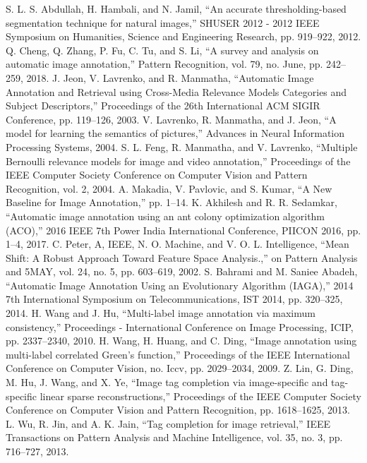 \documentclass[conference]{IEEEtran}
\begin{document}
\begin{thebibliography}{00}
	
	 S. L. S. Abdullah, H. Hambali, and N. Jamil, “An accurate thresholding-based segmentation technique for natural images,” SHUSER 2012 - 2012 IEEE Symposium on
Humanities, Science and Engineering Research, pp. 919–922, 2012.
	 Q. Cheng, Q. Zhang, P. Fu, C. Tu, and S. Li, “A survey and analysis on automatic
image annotation,” Pattern Recognition, vol. 79, no. June, pp. 242–259, 2018.
	 J. Jeon, V. Lavrenko, and R. Manmatha, “Automatic Image Annotation and Retrieval
using Cross-Media Relevance Models Categories and Subject Descriptors,” Proceedings
of the 26th International ACM SIGIR Conference, pp. 119–126, 2003.
	 V. Lavrenko, R. Manmatha, and J. Jeon, “A model for learning the semantics of
pictures,” Advances in Neural Information Processing Systems, 2004.
	 S. L. Feng, R. Manmatha, and V. Lavrenko, “Multiple Bernoulli relevance models for
image and video annotation,” Proceedings of the IEEE Computer Society Conference
on Computer Vision and Pattern Recognition, vol. 2, 2004.
	 A. Makadia, V. Pavlovic, and S. Kumar, “A New Baseline for Image Annotation,” pp. 1–14.
	 K. Akhilesh and R. R. Sedamkar, “Automatic image annotation using an ant colony
optimization algorithm (ACO),” 2016 IEEE 7th Power India International Conference,
PIICON 2016, pp. 1–4, 2017.
	 C. Peter, A, IEEE, N. O. Machine, and V. O. L. Intelligence, “Mean Shift: A Robust
Approach Toward Feature Space Analysis.,” on Pattern Analysis and 5MAY, vol. 24,
no. 5, pp. 603–619, 2002.
	 S. Bahrami and M. Saniee Abadeh, “Automatic Image Annotation Using an Evolutionary Algorithm (IAGA),” 2014 7th International Symposium on Telecommunications,
IST 2014, pp. 320–325, 2014.
	 H. Wang and J. Hu, “Multi-label image annotation via maximum consistency,” Proceedings - International Conference on Image Processing, ICIP, pp. 2337–2340, 2010.
	 H. Wang, H. Huang, and C. Ding, “Image annotation using multi-label correlated
Green’s function,” Proceedings of the IEEE International Conference on Computer
Vision, no. Iccv, pp. 2029–2034, 2009.
	 Z. Lin, G. Ding, M. Hu, J. Wang, and X. Ye, “Image tag completion via image-specific
and tag-specific linear sparse reconstructions,” Proceedings of the IEEE Computer
Society Conference on Computer Vision and Pattern Recognition, pp. 1618–1625, 2013.
	 L. Wu, R. Jin, and A. K. Jain, “Tag completion for image retrieval,” IEEE Transactions on Pattern Analysis and Machine Intelligence, vol. 35, no. 3, pp. 716–727, 2013.

\end{thebibliography}
\end{document}
